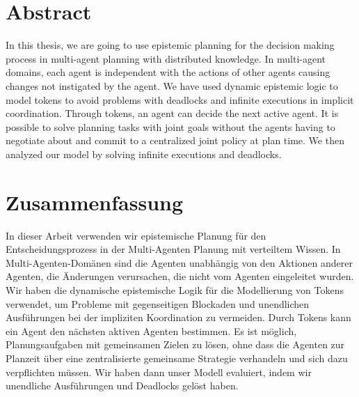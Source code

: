 \chapter*{Abstract}

In this thesis, we are going to use epistemic planning for the decision making process in multi-agent planning with distributed knowledge. In multi-agent domains, each agent is independent with the actions of other agents causing changes not instigated by the agent. We have used dynamic epistemic logic to model tokens to avoid problems with deadlocks and infinite executions in implicit coordination.
Through tokens, an agent can decide the next active agent. It is possible to solve planning tasks with joint goals without the agents having to negotiate about and commit to a centralized joint policy at plan time. We then analyzed our model by solving infinite executions and deadlocks.

\chapter*{Zusammenfassung}

In dieser Arbeit verwenden wir epistemische Planung für den Entscheidungsprozess in der Multi-Agenten Planung mit verteiltem Wissen. In Multi-Agenten-Domänen sind die Agenten unabhängig von den Aktionen anderer Agenten, die Änderungen verursachen, die nicht vom Agenten eingeleitet wurden.
Wir haben die dynamische epistemische Logik für die Modellierung von Tokens verwendet, um Probleme mit gegenseitigen Blockaden und unendlichen Ausführungen bei der impliziten Koordination zu vermeiden. Durch Tokens kann ein Agent den nächsten aktiven Agenten bestimmen. Es ist möglich, Planungsaufgaben mit gemeinsamen Zielen zu lösen, ohne dass die Agenten zur Planzeit über eine zentralisierte gemeinsame Strategie verhandeln und sich dazu verpflichten müssen. Wir haben dann unser Modell evaluiert, indem wir unendliche Ausführungen und Deadlocks gelöst haben.
